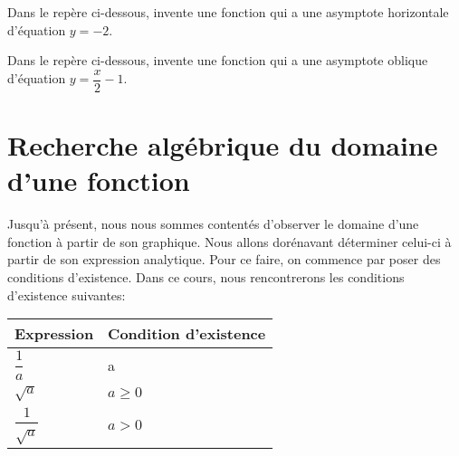 \documentclass[a4paper,12pt]{report}
\renewcommand{\arraystretch}{1.2}
\begin{document}
\begin{exercice}
Dans le repère ci-dessous, invente une fonction qui a une asymptote horizontale
d'équation \(y=-2\).
\begin{center}

\end{center}
\end{exercice}

\begin{exercice}
Dans le repère ci-dessous, invente une fonction qui a une asymptote oblique
d'équation \(y=\dfrac{x}{2}-1\).
\begin{center}

\end{center}
\end{exercice}
\newpage

\section{Recherche algébrique du domaine d'une fonction}
\label{sec:org74b675c}
Jusqu'à présent, nous nous sommes contentés d’observer le domaine d'une fonction
à partir de son graphique. Nous allons dorénavant déterminer celui-ci à partir de son
expression analytique.
Pour ce faire, on commence par poser des conditions d'existence. Dans ce cours,
nous rencontrerons les conditions d'existence suivantes:
\begin{center}
  \renewcommand{\arraystretch}{3}
  \begin{tabular}{|l|l|}\hline
    Expression& Condition d'existence\\\hline
    $\dfrac{1}{a}$&a\neq 0\\\hline
    $\sqrt{a}$&$a\ge 0$\\\hline
    $\dfrac{1}{\sqrt{a}}$&$a>0$\\\hline
  \end{tabular}
\end{center}
\end{document}
